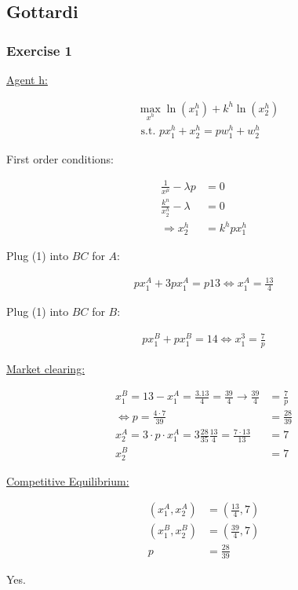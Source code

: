 {
\subsection*{Gottardi}

\subsubsection*{Exercise 1}

\begin{enumerate}[label=(\alph*)]
{\item 
\underline{Agent h:} 

\begin{align*}
    & \max _{x^h} \ln \left(x_1^h\right)+k^h \ln \left(x_2^h\right) \\
    & \text { s.t. } p x_1^h+x_2^h=p w_1^h+w_2^h
\end{align*}

First order conditions:

\begin{align*}
    \frac{1}{x^\mu}-\lambda p &= 0 \\
    \frac{k^n}{x_2^h}-\lambda &= 0 \\
    \Rightarrow x_2^h &= k^h p x_1^h \tag{1}
\end{align*}

Plug (1) into $B C$ for $A$:

\begin{align*}
p x_1^A+3 p x_1^A=p 13 \Longleftrightarrow x_1^A=\frac{13}{4}
\end{align*}

Plug (1) into $B C$ for $B$:

\begin{align*}
p x_1^B+p x_1^B=14 \Longleftrightarrow x_1^3=\frac{7}{p}
\end{align*}

\underline{Market clearing:}

\begin{align*}
    x_1^B=13-x_1^A=\frac{3.13}{4}=\frac{39}{4} \rightarrow \frac{39}{4}&=\frac{7}{p} \\
    \Longleftrightarrow p=\frac{4\cdot7}{39}&=\frac{28}{39} \\
    x_2^A=3 \cdot p \cdot x_1^A=3 \frac{28}{35} \frac{13}{4}=\frac{7 \cdot 13}{13}&=7 \\
    x_2^B&=7
\end{align*}

\underline{Competitive Equilibrium:}

\begin{align*}
    \left(x_1^A, x_2^A\right)&=(\frac{13}{4},7) \\
    \left(x_1^B, x_2^B\right)&=(\frac{39}{4},7) \\
    p &= \frac{28}{39}
\end{align*}
}
{\item 
Yes. 

}
\end{enumerate}}
